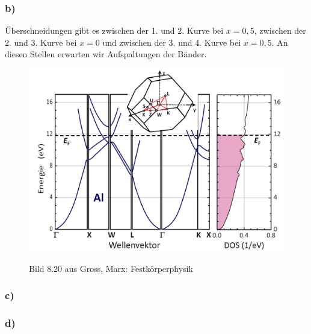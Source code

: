 \subsubsection*{b)}
Überschneidungen gibt es zwischen der 1. und 2. Kurve bei $x = 0,5$, zwischen der
2. und 3. Kurve bei $x = 0$ und zwischen der 3. und 4. Kurve bei $x = 0,5$.
An diesen Stellen erwarten wir Aufspaltungen der Bänder.
\newpage
\begin{figure}
  \centering
  \includegraphics[width=11.5cm]{aufgabe15c.png}
\label{bild15c}
\caption{Bild 8.20 aus Gross, Marx: Festkörperphysik}
\end{figure}
\subsubsection*{c)}
\suppressfloats



\subsubsection*{d)}

